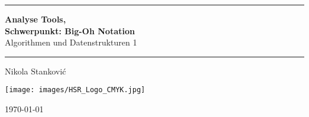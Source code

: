 \documentclass[a4paper,12pt]{scrartcl}
\newcommand{\documenttitel}{Analyse Tools}
\newcommand{\documentsubtitel}{Algorithmen und Datenstrukturen 1}
\newcommand{\documentauthors}{Nikola Stanković}
\newcommand\HRule{\noindent\rule{\linewidth}{2pt}}
\begin{document}
\author{
  Stanković, Nikola
}

\begin{titlepage}
	\vspace*{2cm}
	\HRule
	\vspace*{5pt}
	\begin{flushright}
	{\Huge \textbf{\documenttitel, \\ Schwerpunkt: Big-Oh Notation} \\ \vspace*{25pt} \Large \documentsubtitel}
	\end{flushright}
	\vspace*{5pt}
	\HRule
	\begin{flushright}
	\vspace{20pt}
	\LARGE
	\documentauthors
	\end{flushright}
	
	\vfill	
	
	\begin{center}
		\texttt{[image: images/HSR\_Logo\_CMYK.jpg]}\par\vspace{1cm}
		{\large \today \par}
	\end{center}
\end{titlepage}

\tableofcontents
\newpage








\newpage
\printglossaries
\end{document}
